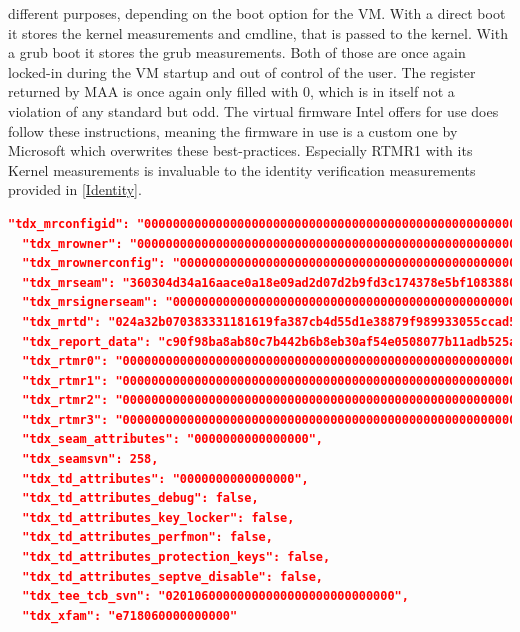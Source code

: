 different purposes, depending on the boot option for the VM. With a direct boot it stores the kernel measurements and cmdline, that is passed to the kernel. With a grub boot it stores the grub measurements. Both of those are once again locked-in during the VM startup and out of control of the user. The register returned by MAA is once again only filled with 0, which is in itself not a violation of any standard but odd. The virtual firmware Intel offers for use does follow these instructions, meaning the firmware in use is a custom one by Microsoft which overwrites these best-practices. Especially RTMR1 with its Kernel measurements is invaluable to the identity verification measurements provided in \ref{Identity}. 


\begin{lstlisting}[language=json,caption={TDX generated part of an MAA quote},captionpos=b]
  "tdx_mrconfigid": "000000000000000000000000000000000000000000000000000000000000000000000000000000000000000000000000",
  "tdx_mrowner": "000000000000000000000000000000000000000000000000000000000000000000000000000000000000000000000000",
  "tdx_mrownerconfig": "000000000000000000000000000000000000000000000000000000000000000000000000000000000000000000000000",
  "tdx_mrseam": "360304d34a16aace0a18e09ad2d07d2b9fd3c174378e5bf108388079827f89ff62acc5f8c473dd40706324834e202946",
  "tdx_mrsignerseam": "000000000000000000000000000000000000000000000000000000000000000000000000000000000000000000000000",
  "tdx_mrtd": "024a32b070383331181619fa387cb4d55d1e38879f989933055ccad5bc2db795d1737b66205949d15469dc8c1ba7ab7b",
  "tdx_report_data": "c90f98ba8ab80c7b442b6b8eb30af54e0508077b11adb525af6dfbcc8714e52a0000000000000000000000000000000000000000000000000000000000000000",
  "tdx_rtmr0": "000000000000000000000000000000000000000000000000000000000000000000000000000000000000000000000000",
  "tdx_rtmr1": "000000000000000000000000000000000000000000000000000000000000000000000000000000000000000000000000",
  "tdx_rtmr2": "000000000000000000000000000000000000000000000000000000000000000000000000000000000000000000000000",
  "tdx_rtmr3": "000000000000000000000000000000000000000000000000000000000000000000000000000000000000000000000000",
  "tdx_seam_attributes": "0000000000000000",
  "tdx_seamsvn": 258,
  "tdx_td_attributes": "0000000000000000",
  "tdx_td_attributes_debug": false,
  "tdx_td_attributes_key_locker": false,
  "tdx_td_attributes_perfmon": false,
  "tdx_td_attributes_protection_keys": false,
  "tdx_td_attributes_septve_disable": false,
  "tdx_tee_tcb_svn": "02010600000000000000000000000000",
  "tdx_xfam": "e718060000000000"
\end{lstlisting}
\label{td_quote}

